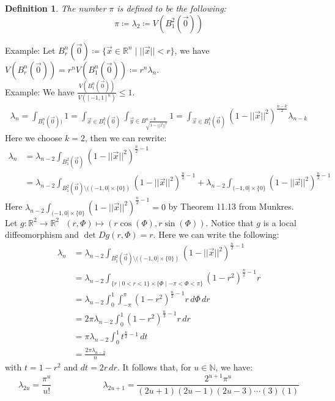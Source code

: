 \documentclass[15pt]{book}
\theoremstyle{break}
\theoremstyle{break}
\newtheorem{defn}{Definition}[corL]
\newcommand{\R}{\mathbb{R}}
\newcommand{\N}{\mathbb{N}}
\newcommand{\example}{\color{green}Example: \color{black}}
\begin{document}
\hfill\break
\begin{defn}
The number $\pi$ is defined to be the following:
$$\pi \coloneqq \lambda_2 \coloneqq V(B_1^2(\vec{0}))$$
\end{defn}

\hfill\break

\example Let $B_r^n(\vec{0}) \coloneqq \{ \vec{x}\in \R^n \mid ||\vec{x}|| <r\}$, we have $V(B_r^n(\vec{0})) = r^n V(B_1^n(\vec{0})) \coloneqq r^n\lambda_n$.\\

\newpage
\example We have $\frac{V(B_1^n(\vec{0}))}{V([-1,1]^n)} \leq 1$.
\begin{align*}
\lambda_n = \int_{B_1^n(\vec{0}))} 1 = \int_{\vec{x}\in B_1^k (\vec{0})} \int_{\vec{y}\in B_{\sqrt{1-||\vec{x}||^2}}^{n-k}} 1 = \int_{\vec{x}\in B_1^k(\vec{0})} \left(1-||\vec{x}||^2\right)^{\frac{n-k}{2}} \lambda_{n-k} 
\end{align*}
Here we choose $k=2$, then we can rewrite:
\begin{align*}
\lambda_n &= \lambda_{n-2} \int_{B_1^2(\vec{0})} (1-||\vec{x}||^2)^{\frac{n}{2}-1} \\&= \lambda_{n-2} \int_{B_1^2(\vec{0})\setminus ((-1,0]\times \{0\})} (1-||\vec{x}||^2)^{\frac{n}{2}-1} + \lambda_{n-2} \int_{(-1,0]\times \{0\}} ( 1-||\vec{x}||^2)^{\frac{n}{2}-1}
\end{align*}
Here $\lambda_{n-2} \int_{(-1,0]\times \{0\}} ( 1-||\vec{x}||^2)^{\frac{n}{2}-1} = 0$ by Theorem 11.13 from Munkres. \\
Let $g:\R^2 \to \R^2 \ \ \ (r,\Phi) \mapsto (r\cos(\Phi),r\sin(\Phi))$. Notice that $g$ is a local diffeomorphism and $\det Dg(r,\Phi) = r$. Here we can write the following:
\begin{align*}
\lambda_n &=  \lambda_{n-2} \int_{B_1^2(\vec{0})\setminus ((-1,0]\times \{0\})} (1-||\vec{x}||^2)^{\frac{n}{2}-1} \\
&= \lambda_{n-2} \int_{\{r \mid 0<r<1\}\times \{\Phi \mid -\pi<\Phi <\pi\}} (1-r^2)^{\frac{n}{2}-1} r\\
&= \lambda_{n-2} \int_0^1 \int_{-\pi}^\pi (1-r^2)^{\frac{n}{2}-1} r\, d\Phi\, dr\\
&= 2 \pi \lambda_{n-2} \int_0^1 (1-r^2)^{\frac{n}{2}-1} r\, dr\\
&= \pi \lambda_{n-2} \int_{0}^1 t^{\frac{n}{2}-1}\, dt \\
&= \frac{2\pi\lambda_{n-2}}{n}
\end{align*}
with $t =1-r^2$ and $dt = 2r\, dr$. It follows that, for $u \in \N$, we have: $$\lambda_{2u} = \frac{\pi^u}{u!} \qquad\qquad\qquad\lambda_{2u+1} = \frac{2^{u+1}\pi^u}{(2u+1)(2u-1)(2u-3)\cdots(3)(1)}$$
\end{document}
